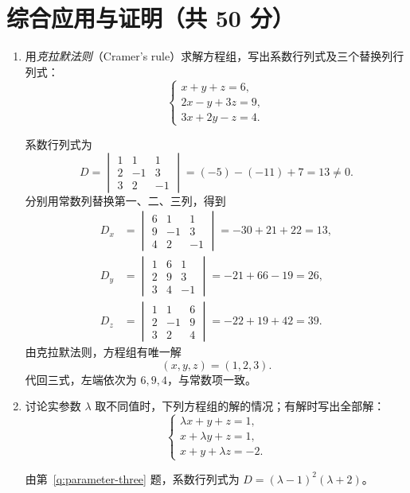 \documentclass[UTF8,12pt,a4paper,fontset=fandol]{ctexart}
\begin{document}
\section{综合应用与证明（共 50 分）}
\begin{enumerate}[label=\arabic*.,resume=detquestions]

\item\label{q:cramer}
用\emph{克拉默法则}（Cramer's rule）求解方程组，写出系数行列式及三个替换列行列式：
\[
\begin{cases}
x+y+z=6,\\
2x-y+3z=9,\\
3x+2y-z=4.
\end{cases}
\]
\begin{solve}
系数行列式为
\[
D=\begin{vmatrix}1&1&1\\2&-1&3\\3&2&-1\end{vmatrix}
=(-5)-(-11)+7=13\ne0.
\]
分别用常数列替换第一、二、三列，得到
\begin{align*}
D_x&=\begin{vmatrix}6&1&1\\9&-1&3\\4&2&-1\end{vmatrix}
=-30+21+22=13,\\
D_y&=\begin{vmatrix}1&6&1\\2&9&3\\3&4&-1\end{vmatrix}
=-21+66-19=26,\\
D_z&=\begin{vmatrix}1&1&6\\2&-1&9\\3&2&4\end{vmatrix}
=-22+19+42=39.
\end{align*}
由克拉默法则，方程组有唯一解
\[
\boxed{(x,y,z)=(1,2,3).}
\]
代回三式，左端依次为 $6,9,4$，与常数项一致。
\end{solve}

\item\label{q:parameter-system}
讨论实参数 $\lambda$ 取不同值时，下列方程组的解的情况；有解时写出全部解：
\[
\begin{cases}
\lambda x+y+z=1,\\
x+\lambda y+z=1,\\
x+y+\lambda z=-2.
\end{cases}
\]
\begin{solve}
由第~\ref{q:parameter-three} 题，系数行列式为
$D=(\lambda-1)^2(\lambda+2)$。


\end{solve}
\end{enumerate}
\end{document}
